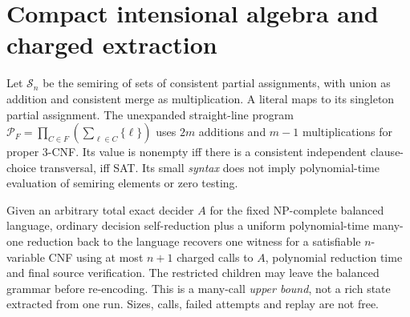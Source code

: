 \documentclass[11pt]{article}
\begin{document}
\section{Compact intensional algebra and charged extraction}
Let $\mathcal S_n$ be the semiring of sets of consistent partial assignments, with union as addition and consistent merge as multiplication. A literal maps to its singleton partial assignment. The unexpanded straight-line program
$\mathcal P_F=\prod_{C\in F}(\sum_{\ell\in C}\{\ell\})$
uses $2m$ additions and $m-1$ multiplications for proper 3-CNF. Its value is nonempty iff there is a consistent independent clause-choice transversal, iff SAT. Its small \emph{syntax} does not imply polynomial-time evaluation of semiring elements or zero testing.
\par\noindent Given an arbitrary total exact decider $A$ for the fixed NP-complete balanced language, ordinary decision self-reduction plus a uniform polynomial-time many-one reduction back to the language recovers one witness for a satisfiable $n$-variable CNF using at most $n+1$ charged calls to $A$, polynomial reduction time and final source verification. The restricted children may leave the balanced grammar before re-encoding. This is a many-call \emph{upper bound}, not a rich state extracted from one run. Sizes, calls, failed attempts and replay are not free.
\end{document}
